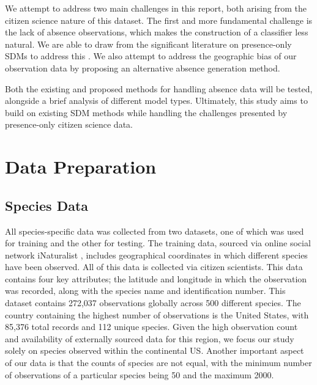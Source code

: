 \documentclass{article}
\begin{document}
We attempt to address two main challenges in this report, both  arising from the citizen science nature of this dataset. The first and more fundamental challenge is the lack of absence observations, which makes the construction of a classifier less natural. We are able to draw from the significant literature on presence-only SDMs to address this \cite{Elith_2006} \cite{Elith_2022}. We also attempt to address the geographic bias of our observation data by proposing an alternative absence generation method.

Both the existing and proposed methods for handling absence data will be tested, alongside a brief analysis of different model types. Ultimately, this study aims to build on existing SDM methods while handling the challenges presented by presence-only citizen science data.

\section{Data Preparation}\vspace{-0.3em}

\subsection{Species Data}\vspace{-0.3em}

All species-specific data was collected from two datasets, one of which was used for training and the other for testing. The training data, sourced via online social network iNaturalist \cite{inat}, includes geographical coordinates in which different species have been observed. All of this data is collected via citizen scientists. This data contains four key attributes; the latitude and longitude in which the observation was recorded, along with the species name and identification number. This dataset contains 272,037 observations globally across 500 different species. The country containing the highest number of observations is the United States, with 85,376 total records and 112 unique species. Given the high observation count and availability of externally sourced data for this region, we focus our study solely on species observed within the continental US. Another important aspect of our data is that the counts of species are not equal, with the minimum number of observations of a particular species being 50 and the maximum 2000. 
\end{document}
